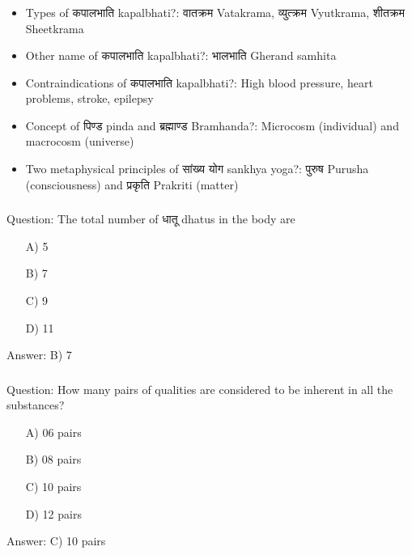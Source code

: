 \begin{frame}[fragile]\frametitle{}
\begin{itemize}
\item Types of कपालभाति kapalbhati?: वातक्रम Vatakrama, व्युत्क्रम Vyutkrama, शीतक्रम Sheetkrama
\item Other name of कपालभाति kapalbhati?: भालभाति Gherand samhita
\item Contraindications of कपालभाति kapalbhati?: High blood pressure, heart problems, stroke, epilepsy
\item Concept of पिण्ड pinda and ब्रह्माण्ड Bramhanda?: Microcosm (individual) and macrocosm (universe)
\item Two metaphysical principles of सांख्य योग sankhya yoga?: पुरुष Purusha (consciousness) and प्रकृति Prakriti (matter)
\end{itemize}
\end{frame}

\begin{frame}[fragile]\frametitle{}

Question: The total number of धातू dhatus in the body are

\begin{itemize}
\item[A)] 5
\item[B)] 7
\item[C)] 9
\item[D)] 11
\end{itemize}

Answer: B) 7
\end{frame}

\begin{frame}[fragile]\frametitle{}

Question: How many pairs of qualities are considered to be inherent in all the substances?

\begin{itemize}
\item[A)] 06 pairs
\item[B)] 08 pairs
\item[C)] 10 pairs
\item[D)] 12 pairs
\end{itemize}

Answer: C) 10 pairs
\end{frame}

